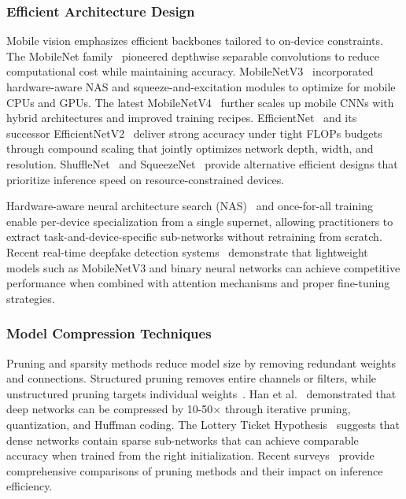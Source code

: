 \subsubsection*{Efficient Architecture Design}
Mobile vision emphasizes efficient backbones tailored to on\hyp device constraints. The MobileNet family~\cite{howard2017mobilenetv1,sandler2018mobilenetv2,howard2019mobilenetv3} pioneered depthwise separable convolutions to reduce computational cost while maintaining accuracy. MobileNetV3~\cite{howard2019mobilenetv3} incorporated hardware\hyp aware NAS and squeeze\hyp and\hyp excitation modules to optimize for mobile CPUs and GPUs. The latest MobileNetV4~\cite{mobilenetv4} further scales up mobile CNNs with hybrid architectures and improved training recipes. EfficientNet~\cite{tan2019efficientnet} and its successor EfficientNetV2~\cite{efficientnetv2} deliver strong accuracy under tight FLOPs budgets through compound scaling that jointly optimizes network depth, width, and resolution. ShuffleNet~\cite{zhang2018shufflenet,ma2018shufflenetv2} and SqueezeNet~\cite{iandola2016squeezenet} provide alternative efficient designs that prioritize inference speed on resource\hyp constrained devices.

Hardware\hyp aware neural architecture search (NAS)~\cite{tan2019mnasnet} and once\hyp for\hyp all training~\cite{cai2020onceforall} enable per\hyp device specialization from a single supernet, allowing practitioners to extract task\hyp and\hyp device\hyp specific sub\hyp networks without retraining from scratch. Recent real\hyp time deepfake detection systems~\cite{lanzino2024bnn,liu2024lightfakedetect} demonstrate that lightweight models such as MobileNetV3 and binary neural networks can achieve competitive performance when combined with attention mechanisms and proper fine\hyp tuning strategies.

\subsubsection*{Model Compression Techniques}
Pruning and sparsity methods reduce model size by removing redundant weights and connections. Structured pruning removes entire channels or filters, while unstructured pruning targets individual weights~\cite{blalock2020pruningsurvey}. Han et al.~\cite{han2015learningboth,han2016deepcompression} demonstrated that deep networks can be compressed by 10-50× through iterative pruning, quantization, and Huffman coding. The Lottery Ticket Hypothesis~\cite{frankle2019lottery} suggests that dense networks contain sparse sub\hyp networks that can achieve comparable accuracy when trained from the right initialization. Recent surveys~\cite{blalock2020pruningsurvey} provide comprehensive comparisons of pruning methods and their impact on inference efficiency.

